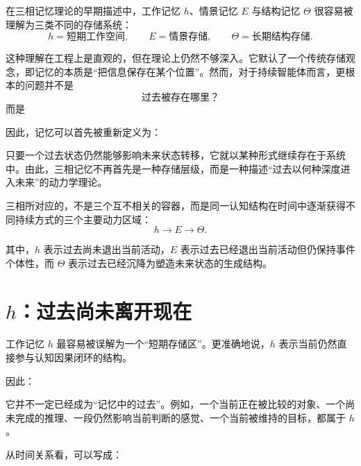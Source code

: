在三相记忆理论的早期描述中，工作记忆 $h$、情景记忆 $E$ 与结构记忆 $\Theta$ 很容易被理解为三类不同的存储系统：
\[
h=\text{短期工作空间},
\qquad
E=\text{情景存储},
\qquad
\Theta=\text{长期结构存储}.
\]

这种理解在工程上是直观的，但在理论上仍然不够深入。它默认了一个传统存储观念，即记忆的本质是“把信息保存在某个位置”。然而，对于持续智能体而言，更根本的问题并不是
\[
\text{过去被存在哪里？}
\]
而是
\begin{statementbox}
\centering
{}
\end{statementbox}

因此，记忆可以首先被重新定义为：
\begin{statementbox}
\centering
{}
\end{statementbox}

只要一个过去状态仍然能够影响未来状态转移，它就以某种形式继续存在于系统中。由此，三相记忆不再首先是一种存储层级，而是一种描述“过去以何种深度进入未来”的动力学理论。

三相所对应的，不是三个互不相关的容器，而是同一认知结构在时间中逐渐获得不同持续方式的三个主要动力区域：
\[
\boxed{
h
\rightarrow
E
\rightarrow
\Theta.
}
\]

其中，$h$ 表示过去尚未退出当前活动，$E$ 表示过去已经退出当前活动但仍保持事件个体性，而 $\Theta$ 表示过去已经沉降为塑造未来状态的生成结构。

\section{$h$：过去尚未离开现在}

工作记忆 $h$ 最容易被误解为一个“短期存储区”。更准确地说，$h$ 表示当前仍然直接参与认知因果闭环的结构。

因此：
\begin{statementbox}
\centering
{}
\end{statementbox}

它并不一定已经成为“记忆中的过去”。例如，一个当前正在被比较的对象、一个尚未完成的推理、一段仍然影响当前判断的感觉、一个当前被维持的目标，都属于 $h$。

从时间关系看，可以写成：
\begin{statementbox}
\centering
{}
\end{statementbox}

